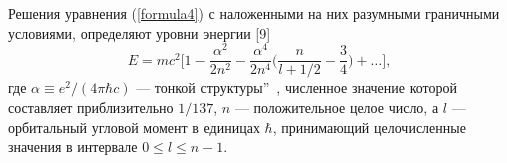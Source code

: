 \documentclass{article}
\begin{document}
		Решения уравнения (\ref{formula4}) с наложенными на них разумными граничными условиями, определяют уровни энергии [9]
		\begin{equation}
			\label{formula5}
			E = mc^2\biggl[1-\frac{\alpha^2}{2n^2}-\frac{\alpha^4}{2n^4}\biggl(\frac{n}{l+1/2}-\frac{3}{4}\biggl)+\ldots \biggr],
		\end{equation}
		где $\alpha \equiv e^2 / (4 \pi \hbar c)$ ---  тонкой структуры\textquotedblright\ , численное значение которой составляет приблизительно $1/137$, $n$ --- положительное целое число, а $l$ --- орбитальный угловой момент в единицах $\hbar$, принимающий целочисленные значения в интервале $0 \le l \le n-1$.
\end{document}
